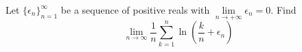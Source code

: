 Let $\{\epsilon_n\}^\infty_{n=1}$ be a sequence of positive reals with $\lim\limits_{n\rightarrow+\infty}\epsilon_n = 0$. Find \[ \lim\limits_{n\rightarrow\infty}\dfrac{1}{n}\sum\limits^{n}_{k=1}\ln\left(\dfrac{k}{n}+\epsilon_n\right)  \]